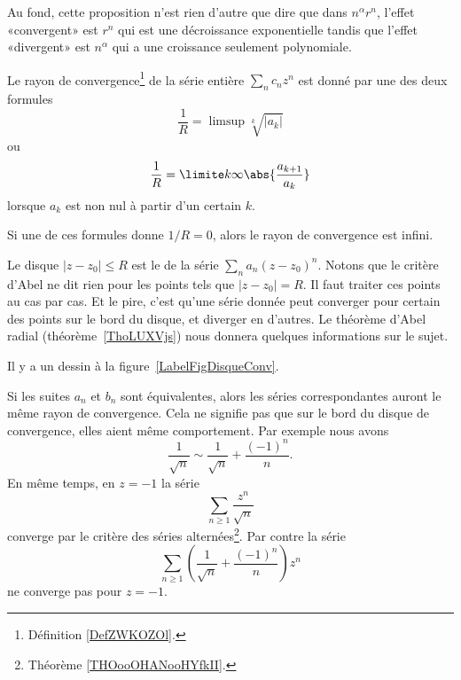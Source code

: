 \begin{remark}
    Au fond, cette proposition n'est rien d'autre que dire que dans \( n^\alpha r^n\), l'effet «convergent» est \( r^n\) qui est une décroissance exponentielle tandis que l'effet «divergent» est \( n^{\alpha}\) qui a une croissance seulement polynomiale.
\end{remark}

\begin{theorem} \label{ThoSerPuissRap}
    Le rayon de convergence\footnote{Définition \ref{DefZWKOZOl}.} de la série entière \( \sum_n c_n z^n\) est donné par une des deux formules
    \begin{equation}		\label{EqRayCOnvSer}
        \frac{1}{ R } =\limsup\sqrt[k]{| a_k |}
    \end{equation}
    ou
    \begin{equation}		\label{EqAlphaSerPuissAtern}
        \frac{1}{ R }=\limite k \infty \abs{\frac{a_{k+1}}{a_k}}
    \end{equation}
    lorsque $a_k$ est non nul à partir d'un certain $k$.

    Si une de ces formules donne \( 1/R=0\), alors le rayon de convergence est infini.
\end{theorem}

Le disque $| z-z_0 |\leq R$ est le  de la série \( \sum_n a_n(z-z_0)^n\). Notons que le critère d'Abel ne dit rien pour les points tels que $| z-z_0 |=R$. Il faut traiter ces points au cas par cas. Et le pire, c'est qu'une série donnée peut converger pour certain des points sur le bord du disque, et diverger en d'autres. Le théorème d'Abel radial (théorème~\ref{ThoLUXVjs}) nous donnera quelques informations sur le sujet.

Il y a un dessin à la figure~\ref{LabelFigDisqueConv}.
\newcommand{\CaptionFigDisqueConv}{À l'intérieur du disque de convergence, la convergence est absolue. En dehors, la série diverge. Sur le cercle proprement dit, tout peut arriver.}


Si les suites \( a_n\) et \( b_n\) sont équivalentes, alors les séries correspondantes auront le même rayon de convergence. Cela ne signifie pas que sur le bord du disque de convergence, elles aient même comportement. Par exemple nous avons
\begin{equation}
    \frac{1}{ \sqrt{n} }\sim \frac{1}{ \sqrt{n} }+\frac{ (-1)^n }{ n }.
\end{equation}
En même temps, en \( z=-1\) la série
\begin{equation}
    \sum_{n\geq 1}\frac{ z^n }{ \sqrt{n} }
\end{equation}
converge par le critère des séries alternées\footnote{Théorème \ref{THOooOHANooHYfkII}.}. Par contre la série
\begin{equation}
    \sum_{n\geq 1}\left( \frac{1}{ \sqrt{n} }+\frac{ (-1)^n }{ n } \right)z^n
\end{equation}
ne converge pas pour \( z=-1\).

